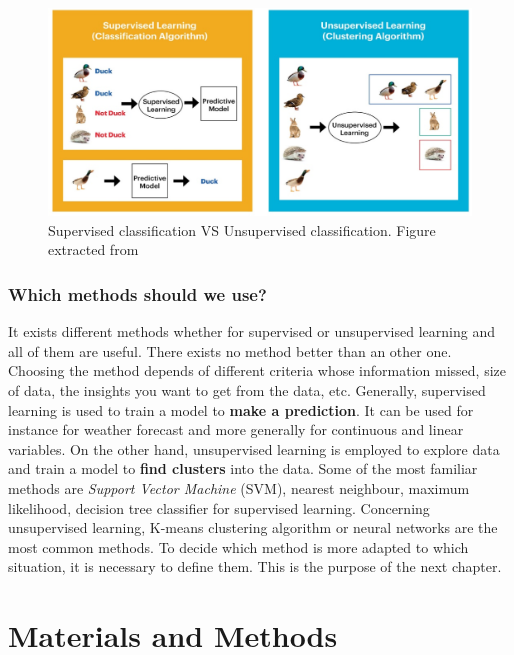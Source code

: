 \documentclass[11pt, openany]{report}
\theoremstyle{plain}
\theoremstyle{definition}
\theoremstyle{remark}
\begin{document}
\begin{figure}[h]
  \centering
  \includegraphics[scale=0.5]{figures/supervised-unsupervised-2.png}
  \caption{Supervised classification VS Unsupervised classification. Figure extracted from \cite{supervisedVSunsupervised-2}}
  \label{fig:supervised-unsupervised-2}
\end{figure}

\subsection{Which methods should we use?}
It exists different methods whether for supervised or unsupervised learning and all of them are useful. There exists no method better than an other one. Choosing the method depends of different criteria whose information missed, size of data, the insights you want to get from the data, etc. Generally, supervised learning is used to train a model to \textbf{make a prediction}. It can be used for instance for weather forecast and more generally for continuous and linear variables. On the other hand, unsupervised learning is employed to explore data and train a model to \textbf{find clusters} into the data. Some of the most familiar methods are \textit{Support Vector Machine} (SVM), nearest neighbour, maximum likelihood, decision tree classifier for supervised learning. Concerning unsupervised learning, K-means clustering algorithm or neural networks are the most common methods. To decide which method is more adapted to which situation, it is necessary to define them. This is the purpose of the next chapter. 




\chapter{Materials and Methods} \label{chap:methods}%
\end{document}
